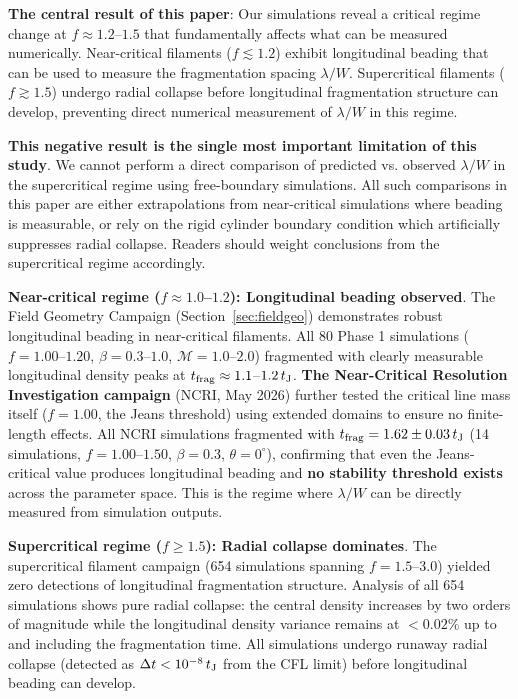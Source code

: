 \documentclass[twocolumn]{mnras}
\begin{document}
\textbf{The central result of this paper}: Our simulations reveal a critical regime change at $f \approx 1.2$--$1.5$ that fundamentally affects what can be measured numerically. Near-critical filaments ($f \lesssim 1.2$) exhibit longitudinal beading that can be used to measure the fragmentation spacing $\lambda/W$. Supercritical filaments ($f \gtrsim 1.5$) undergo radial collapse before longitudinal fragmentation structure can develop, preventing direct numerical measurement of $\lambda/W$ in this regime.

\textbf{This negative result is the single most important limitation of this study}. We cannot perform a direct comparison of predicted vs. observed $\lambda/W$ in the supercritical regime using free-boundary simulations. All such comparisons in this paper are either extrapolations from near-critical simulations where beading is measurable, or rely on the rigid cylinder boundary condition which artificially suppresses radial collapse. Readers should weight conclusions from the supercritical regime accordingly.

\textbf{Near-critical regime ($f \approx 1.0$--$1.2$): Longitudinal beading observed}. The Field Geometry Campaign (Section~\ref{sec:fieldgeo}) demonstrates robust longitudinal beading in near-critical filaments. All 80 Phase 1 simulations ($f = 1.00$--$1.20$, $\beta = 0.3$--$1.0$, $\mathcal{M} = 1.0$--$2.0$) fragmented with clearly measurable longitudinal density peaks at $t_{\rm frag} \approx 1.1$--$1.2\,t_{\rm J}$. \textbf{The Near-Critical Resolution Investigation campaign} (NCRI, May 2026) further tested the critical line mass itself ($f = 1.00$, the Jeans threshold) using extended domains to ensure no finite-length effects. All NCRI simulations fragmented with $t_{\rm frag} = 1.62 \pm 0.03\,t_{\rm J}$ (14 simulations, $f = 1.00$--$1.50$, $\beta = 0.3$, $\theta = 0^{\circ}$), confirming that even the Jeans-critical value produces longitudinal beading and \textbf{no stability threshold exists} across the parameter space. This is the regime where $\lambda/W$ can be directly measured from simulation outputs.

\textbf{Supercritical regime ($f \geq 1.5$): Radial collapse dominates}. The supercritical filament campaign (654 simulations spanning $f = 1.5$--$3.0$) yielded zero detections of longitudinal fragmentation structure. Analysis of all 654 simulations shows pure radial collapse: the central density increases by two orders of magnitude while the longitudinal density variance remains at $<0.02\%$ up to and including the fragmentation time. All simulations undergo runaway radial collapse (detected as $\Delta t < 10^{-8}\,t_{\rm J}$ from the CFL limit) before longitudinal beading can develop.
\end{document}
